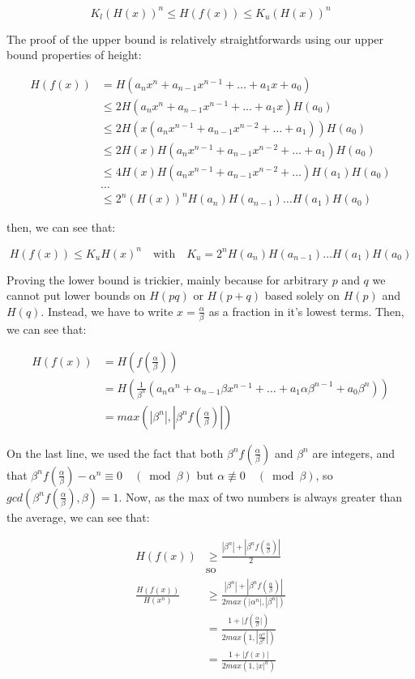 \documentclass{article}
\begin{document}
\[ K_l (H(x))^n \leq H(f(x)) \leq K_u (H(x))^n \]

The proof of the upper bound is relatively straightforwards using our upper bound properties of height:

\begin{align*} 
H(f(x)) &= H(a_n x^n + a_{n-1}x^{n-1} + \dots + a_1 x + a_0)\\
&\leq 2H(a_n x^n + a_{n-1}x^{n-1} + \dots + a_1 x)H(a_0)\\
&\leq 2H(x(a_n x^{n-1} + a_{n-1}x^{n-2} + \dots + a_1))H(a_0)\\
&\leq 2H(x)H(a_n x^{n-1} + a_{n-1}x^{n-2} + \dots + a_1)H(a_0)\\
&\leq 4H(x)H(a_n x^{n-1} + a_{n-1}x^{n-2} + \dots)H(a_1)H(a_0)\\
&\dots\\
&\leq 2^n (H(x))^n H(a_n)H(a_{n-1})\dots H(a_1)H(a_0)
\end{align*} 

then, we can see that:

\[ H(f(x)) \leq K_u H(x)^n \quad \text{with} \quad K_u = 2^n H(a_n)H(a_{n-1})\dots H(a_1)H(a_0) \]

Proving the lower bound is trickier, mainly because for arbitrary $p$ and $q$ we cannot put lower bounds on $H(pq)$ or $H(p + q)$ based solely on $H(p)$ and $H(q)$. Instead, we have to write $x = \frac{\alpha}{\beta}$ as a fraction in it's lowest terms. Then, we can see that:

\begin{align*}
    H(f(x)) &= H(f(\frac{\alpha}{\beta}))\\
            &= H(\frac{1}{\beta^n}(a_n \alpha^n + \alpha_{n-1} \beta x^{n-1} + \dots + a_1 \alpha \beta^{n-1} + a_0 \beta^n))\\
            &= max(|\beta^n|, |\beta^n f(\frac{\alpha}{\beta})|)\
\end{align*}

On the last line, we used the fact that both $\beta^n f(\frac{\alpha}{\beta})$ and $\beta^n$ are integers, and that $\beta^n f(\frac{\alpha}{\beta}) - \alpha^n \equiv 0 \quad (\bmod{\beta})$ but $\alpha \not\equiv 0 \quad (\bmod{\beta})$, so $gcd(\beta^n f(\frac{\alpha}{\beta}), \beta) = 1$. Now, as the max of two numbers is always greater than the average, we can see that:

\begin{align*}
    H(f(x)) & \geq \frac{|\beta^n| + |\beta^n f(\frac{\alpha}{\beta})|}{2}\\
    &\text{so}\\
    \frac{H(f(x))}{H(x^n)} &\geq \frac{|\beta^n| + |\beta^n f(\frac{\alpha}{\beta})|}{2 max(|\alpha^n|,|\beta^n|)}\\
                        &= \frac{1 + |f(\frac{\alpha}{\beta}|)}{2 max(1, |\frac{\alpha^n}{\beta^n}|)}\\
                        &= \frac{1 + |f(x)|}{2 max(1, |x|^n)}
\end{align*}
\end{document}
